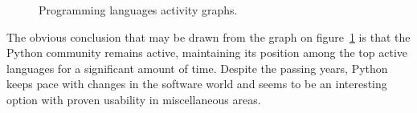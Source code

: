 \begin{figure}[ht]
  \begin{center}
  \end{center}
  \caption{Programming languages activity graphs.}
  \label{fig:ohloh_lang_graph}
\end{figure}
The obvious conclusion that may be drawn from the graph on figure~\ref{fig:ohloh_lang_graph} is that the Python community remains active, maintaining its position among the top active languages for a significant amount of time. Despite the passing years, Python keeps pace with changes in the software world and seems to be an interesting option with proven usability in miscellaneous areas.  

